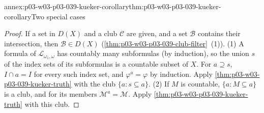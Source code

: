 \begin{annexitem}{annex:p03-w03-p03-039-kueker-corollary}{thm:p03-w03-p03-039-kueker-corollary}{Two special cases}
\begin{proof}
If a set in \(D(X)\) and a club \(\mathcal C\) are given, and a set
\(\mathcal B\) contains their intersection, then \(\mathcal B\in D(X)\)
(\cref{thm:p03-w03-p03-039-club-filter}~(1)). (1) A formula of
\(\mathcal L_{\omega_1,\omega}\) has countably many subformulas (by
induction), so the union \(s\) of the index sets of its subformulas is a
countable subset of \(X\). For \(a\supseteq s\), \(I\cap a=I\) for every such
index set, and \(\varphi^a=\varphi\) by induction. Apply
\cref{thm:p03-w03-p03-039-kueker-truth} with the club \(\{a:s\subseteq a\}\).
(2) If \(M\) is countable, \(\{a:M\subseteq a\}\) is a club, and for its
members \(\mathcal M^a=\mathcal M\). Apply
\cref{thm:p03-w03-p03-039-kueker-truth} with this club.
\end{proof}
\end{annexitem}

